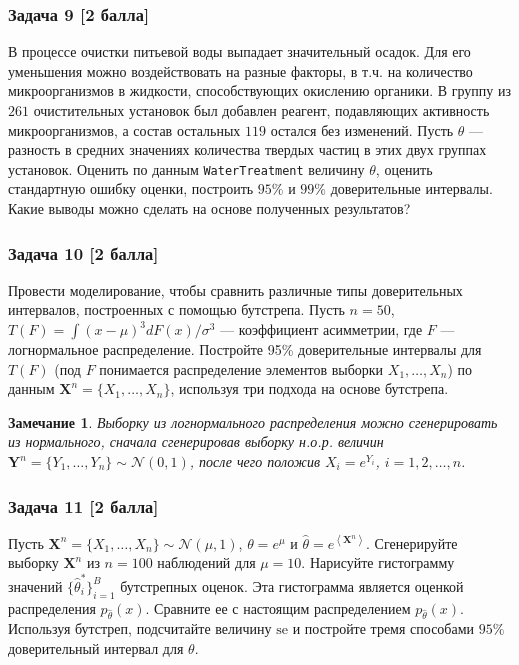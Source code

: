 \documentclass{article}
\newcommand{\lp}{\left(}
\newcommand{\rp}{\right)}
\newcommand{\angmean}[1]{\left\langle #1 \right\rangle}
\newcommand{\esttheta}{\hat{\theta}}
\newcommand{\boldX}{\boldsymbol{X}}
\newcommand{\boldY}{\boldsymbol{Y}}
\newcommand{\Normal}{\mathcal{N}\xspace}
\newcommand{\se}{\ensuremath{\mathrm{se}\xspace}}
\newtheorem*{note-none}{Замечание}
\begin{document}
\subsubsection*{Задача 9 [2 балла]}
В процессе очистки питьевой воды выпадает значительный осадок. Для его уменьшения можно воздействовать на разные факторы,
в т.ч. на количество микроорганизмов в жидкости, способствующих окислению органики. В группу из $261$ очистительных установок
был добавлен реагент, подавляющих активность микроорганизмов, а состав остальных $119$ остался без изменений.
Пусть $\theta$ --- разность в средних значениях количества твердых частиц в этих двух группах установок.
Оценить по данным \texttt{WaterTreatment} величину $\theta$, оценить стандартную ошибку оценки, построить
$95\%$ и $99\%$ доверительные интервалы. Какие выводы можно сделать на основе полученных результатов?

\subsubsection*{Задача 10 [2 балла]}
Провести моделирование, чтобы сравнить различные типы доверительных интервалов, построенных с помощью бутстрепа. Пусть $n = 50$, $T(F) = {\int\lp x-\mu\rp^3dF(x)} / \sigma^{3}$ --- коэффициент асимметрии, где $F$ --- логнормальное распределение. Постройте 95\% доверительные интервалы для $T(F)$ (под $F$ понимается распределение элементов выборки $X_1,\ldots,X_n$) по данным $\boldX^n = \{X_1,\ldots,X_n\}$, используя три подхода на основе бутстрепа.

\begin{note-none}
	Выборку из логнормального распределения можно сгенерировать из нормального, сначала сгенерировав выборку н.о.р. величин $\boldY^n = \{Y_1, \ldots,Y_n\} \sim \Normal(0,1)$, после чего положив $X_i = e^{Y_i}$, $i = 1,2,\ldots,n$.
\end{note-none}

\subsubsection*{Задача 11 [2 балла]}
Пусть $\boldX^n = \{X_1,\ldots, X_n\} \sim \Normal(\mu, 1)$, $\theta = e^{\mu}$ и $\esttheta = e^{\angmean{\boldX^n}}$. 
Сгенерируйте выборку $\boldX^n$ из $n = 100$ наблюдений для $\mu = 10$.
Нарисуйте гистограмму  значений $\{\esttheta^*_i\}_{i=1}^B$ бутстрепных оценок. Эта гистограмма является оценкой распределения $p_{\esttheta}(x)$. Сравните ее с настоящим распределением $p_{\esttheta}(x)$.
Используя бутстреп, подсчитайте величину $\se$ и постройте тремя способами $95\%$ доверительный интервал для $\theta$. 
\end{document}
